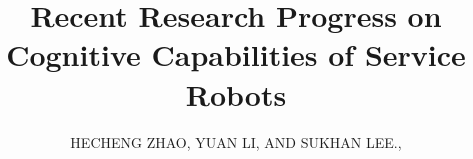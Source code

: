 \documentclass{ieeeaccess}
\begin{document}
\history{}
\doi{}

\title{Recent Research Progress on Cognitive Capabilities of Service Robots}
\author{\uppercase{Hecheng Zhao},
\uppercase{Yuan Li, and Sukhan Lee}.,
}
\address[1]{Intelligent System Research Institute (ISRI),
Sungkyunkwan University, 16419, Suwon, South Korea (e-mail: hczhao@skku.edu)}
\address[2]{Benewake Co., Ltd., Beijing, China (ly@benewake.com)}
\address[3]{Intelligent System Research Institute (ISRI),
Sungkyunkwan University, 16419, Suwon, South Korea (e-mail:
lsh@ece.skku.ac.kr)}


\end{document}

